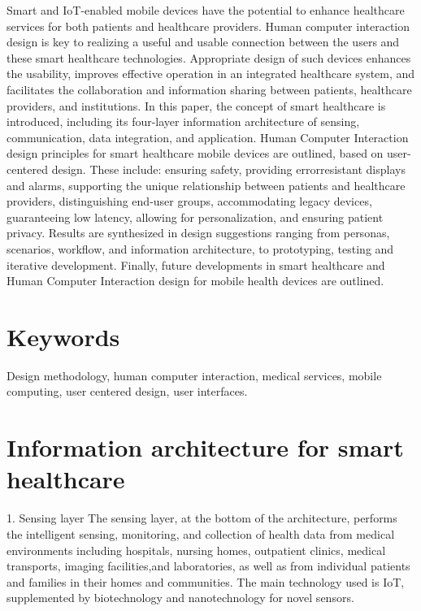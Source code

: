 \documentclass[letterpaper,12pt]{article}
\begin{document}
Smart and IoT-enabled mobile devices have the potential to enhance healthcare services for both patients and healthcare
providers. Human computer interaction design is key to realizing a useful and usable connection between the users and these
smart healthcare technologies. Appropriate design of such devices enhances the usability, improves effective operation in an
integrated healthcare system, and facilitates the collaboration and information sharing between patients, healthcare providers,
and institutions. In this paper, the concept of smart healthcare is introduced, including its four-layer information architecture
of sensing, communication, data integration, and application. Human Computer Interaction design principles for smart
healthcare mobile devices are outlined, based on user-centered design. These include: ensuring safety, providing errorresistant displays and alarms, supporting the unique relationship between patients and healthcare providers, distinguishing
end-user groups, accommodating legacy devices, guaranteeing low latency, allowing for personalization, and ensuring
patient privacy. Results are synthesized in design suggestions ranging from personas, scenarios, workflow, and information
architecture, to prototyping, testing and iterative development. Finally, future developments in smart healthcare and Human
Computer Interaction design for mobile health devices are outlined.

\section{Keywords}

Design methodology, human computer interaction, medical services, mobile computing, user centered design, user interfaces.

\section{Information architecture for smart healthcare}

1. Sensing layer
The sensing layer, at the bottom of the architecture, performs the intelligent sensing, monitoring, and collection of health data from medical environments including hospitals, nursing homes, outpatient clinics, medical transports, imaging facilities,and laboratories, as well as from individual patients and families in their homes and communities. The main technology used is
IoT, supplemented by biotechnology and nanotechnology for novel sensors.
\end{document}
